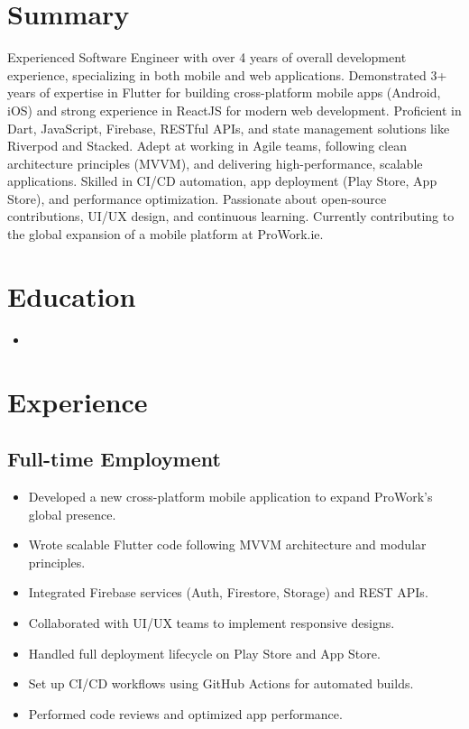 \documentclass[11pt,a4paper,sans]{moderncv}
\begin{document}
\makecvtitle

\vspace{3pt}

\section{Summary}

Experienced Software Engineer with over 4 years of overall development experience, specializing in both mobile and web applications. Demonstrated 3+ years of expertise in Flutter for building cross-platform mobile apps (Android, iOS) and strong experience in ReactJS for modern web development. Proficient in Dart, JavaScript, Firebase, RESTful APIs, and state management solutions like Riverpod and Stacked. Adept at working in Agile teams, following clean architecture principles (MVVM), and delivering high-performance, scalable applications. Skilled in CI/CD automation, app deployment (Play Store, App Store), and performance optimization. Passionate about open-source contributions, UI/UX design, and continuous learning. Currently contributing to the global expansion of a mobile platform at ProWork.ie.

\section{Education}
\begin{itemize}
\item {}
\end{itemize}

\section{Experience}
\subsection{Full-time Employment}

\item {}
{
\begin{itemize}
    \item Developed a new cross-platform mobile application to expand ProWork’s global presence.
    \item Wrote scalable Flutter code following MVVM architecture and modular principles.
    \item Integrated Firebase services (Auth, Firestore, Storage) and REST APIs.
    \item Collaborated with UI/UX teams to implement responsive designs.
    \item Handled full deployment lifecycle on Play Store and App Store.
    \item Set up CI/CD workflows using GitHub Actions for automated builds.
    \item Performed code reviews and optimized app performance.
\end{itemize}
}
\end{document}
